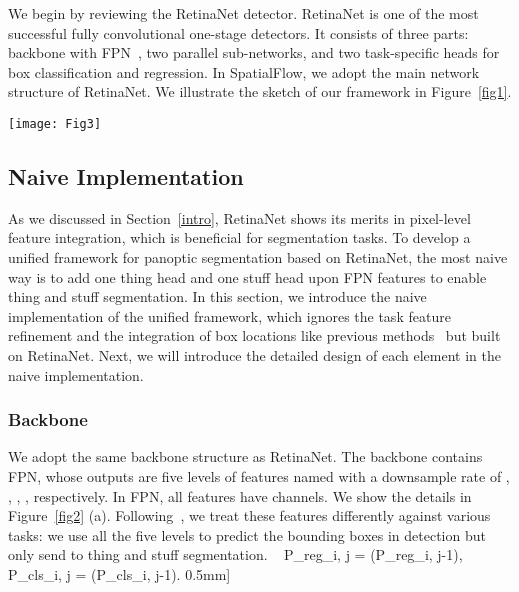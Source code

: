 \documentclass[journal,final]{IEEEtran}
\begin{document}
We begin by reviewing the RetinaNet detector. RetinaNet is one of the most successful fully convolutional one-stage detectors. It consists of three parts: backbone with FPN~\cite{fpn}, two parallel sub-networks, and two task-specific heads for box classification and regression. In SpatialFlow, we adopt the main network structure of RetinaNet. We illustrate the sketch of our framework in Figure~\ref{fig1}. 
\begin{figure*}
  \centering
  \texttt{[image: Fig3]}
  \caption{The designs for each part in SpatialFlow. In the dashed rectangle (a), we show the output features of FPN, which are the features named . In the dashed rectangle (b), we present the architecture of the stuff head. More importantly, all the information flows in sub-networks are illustrated in the dashed box (c).}
   \label{fig2}
\end{figure*}

\subsection{Naive Implementation} \label{sec3.1}
As we discussed in Section~\ref{intro}, RetinaNet shows its merits in pixel-level feature integration, which is beneficial for segmentation tasks. To develop a unified framework for panoptic segmentation based on RetinaNet, the most naive way is to add one thing head and one stuff head upon FPN features to enable thing and stuff segmentation. In this section, we introduce the naive implementation of the unified framework, which ignores the task feature refinement and the integration of box locations like previous methods~\cite{panopticfpn,panopticranking,upsnet} but built on RetinaNet. Next, we will introduce the detailed design of each element in the naive implementation.

\subsubsection{Backbone} 
We adopt the same backbone structure as RetinaNet. The backbone contains FPN, whose outputs are five levels of features named  with a downsample rate of , , , ,  respectively. In FPN, all features have  channels. We show the details in Figure~\ref{fig2} (a). Following~\cite{retinamask}, we treat these features differently against various tasks: we use all the five levels to predict the bounding boxes in detection but only send  to thing and stuff segmentation.
\ \label{eq1}
P_{reg_{i, j}} = \phi(P_{reg_{i, j-1}}), \quad P_{cls_{i, j}} = \phi(P_{cls_{i, j-1}}).
0.5mm]
\end{document}
